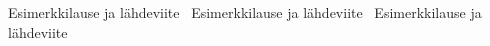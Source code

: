 \documentclass[finnish]{tktltiki2}
\theoremstyle{definition}
\theoremstyle{remark}
\begin{document}
Esimerkkilause ja lähdeviite~\cite{Zhang:2011:ECL:2047594.2047666}
Esimerkkilause ja lähdeviite~\cite{Dhomne:2012:ITL:2382887.2382899}
Esimerkkilause ja lähdeviite~\cite{Li:2006:MOS:1125170.1125182}






%

%
% 
%



\end{document}
